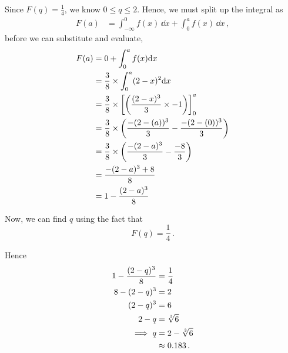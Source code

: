 \begin{subquestions}
\begin{subsubquestions}
Since $F(q) = \frac{1}{4}$, we know $0\leq q \leq 2$. Hence, we must split up the integral as
\begin{align}
	F(a) & = \int_{-\infty}^{0} f(x)\,\dd x + \int_{0}^{a} f(x)\,\dd x \,,
\end{align}
before we can substitute and evaluate,
\begin{align}
	F(a) & = 0 + \int_{0}^{a} f(x)\mathrm{d}x \nonumber \\
	     & = \frac{3}{8} \times \int_{0}^{a} (2-x)^2\mathrm{d}x \nonumber \\
	     & = \frac{3}{8} \times \left[\left(\frac{(2-x)^3}{3} \times -1 \right) \right]_0^a \nonumber \\
	     & = \frac{3}{8} \times \left(\frac{-(2-(a))^3}{3} - \frac{-(2-(0))^3}{3}\right) \nonumber \\
	     & = \frac{3}{8} \times \left(\frac{-(2-a)^3}{3} - \frac{-8}{3}\right) \nonumber \\
	     & = \frac{-(2-a)^3 + 8}{8} \nonumber \\
	     & = 1 - \frac{(2-a)^3}{8}
\end{align}

Now, we can find $q$ using the fact that
\begin{equation}
	F(q) = \frac{1}{4}\,.
\end{equation}

Hence
\begin{align}
	1 - \frac{(2-q)^3}{8} & = \frac{1}{4} \nonumber \\
	            8 - (2-q)^3 & = 2 \nonumber \\
	                (2-q)^3 & = 6 \nonumber \\
	                2-q & = \sqrt[3]{6} \nonumber \\
	                \implies q & = 2 - \sqrt[3]{6} \nonumber \\
	                & \approx 0.183 \,.
\end{align}

\end{subsubquestions}

\end{subquestions}



